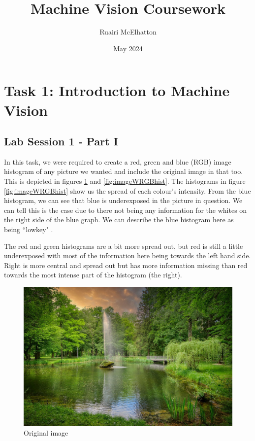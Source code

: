 \documentclass[11pt, letterpaper]{article}
\title{Machine Vision Coursework}
\author{Ruairi McElhatton}
\date{May 2024}
\begin{document}
\maketitle
\pagebreak

\tableofcontents

\pagebreak
\section{Task 1: Introduction to Machine Vision}

\subsection{Lab Session 1 - Part I}
In this task, we were required to create a red, green and blue (RGB) image histogram of any picture we wanted and include the original image in that too. This is depicted in figures \ref{fig:GreenSpaceImage} and \ref{fig:imageWRGBhist}. The histograms in figure \ref{fig:imageWRGBhist} show us the spread of each colour's intensity. From the blue histogram, we can see that blue is underexposed in the picture in question. We can tell this is the case due to there not being any information for the whites on the right side of the blue graph. We can describe the blue histogram here as being ``lowkey" \cite{ImageHistograms}.

The red and green histograms are a bit more spread out, but red is still a little underexposed with most of the information here being towards the left hand side. Right is more central and spread out but has more information missing than red towards the most intense part of the histogram (the right).


\begin{figure}[ht]
    \centering
    \includegraphics[width=0.5\linewidth]{Lab 1/GreenSpaceImage.png}
    \caption{Original image}
    \label{fig:GreenSpaceImage}
\end{figure}
\end{document}
